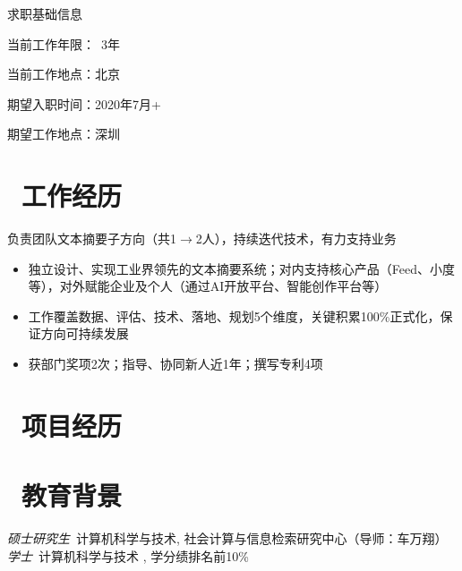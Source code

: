 \documentclass{resume}
\begin{document}




求职基础信息

当前工作年限：~3年

当前工作地点：北京

期望入职时间：2020年7月+ 

期望工作地点：深圳

\section{\faUsers\ 工作经历}

\begin{onehalfspacing}
负责团队文本摘要子方向（共1$ \rightarrow $2人），持续迭代技术，有力支持业务
\begin{itemize}
  \item 独立设计、实现工业界领先的文本摘要系统；对内支持核心产品（Feed、小度等），对外赋能企业及个人（通过AI开放平台、智能创作平台等）
  \item 工作覆盖数据、评估、技术、落地、规划5个维度，关键积累100\%正式化，保证方向可持续发展
  \item 获部门奖项2次；指导、协同新人近1年；撰写专利4项
\end{itemize}
\end{onehalfspacing}

\section{\faUsers\ 项目经历}
\datedsubsection{}{}
\role{}{}

\section{\faGraduationCap\  教育背景}
\textit{硕士研究生}\ 计算机科学与技术, 社会计算与信息检索研究中心（导师：车万翔）
\textit{学士}\ 计算机科学与技术 , 学分绩排名前10\%
\end{document}

